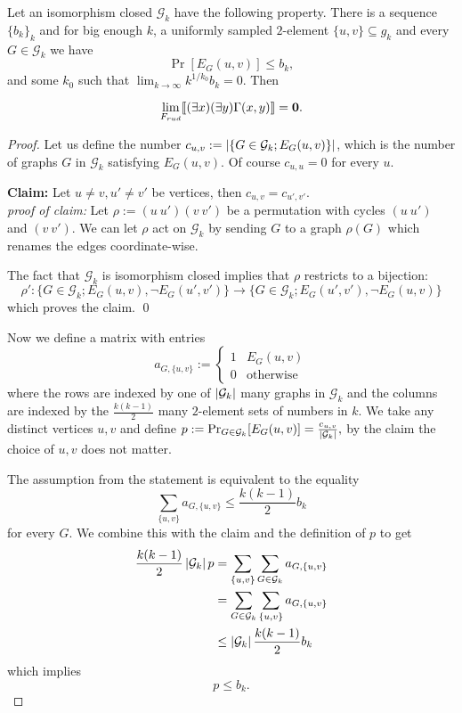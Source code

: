 \begin{thrm}\label{thrmsparse}
Let an isomorphism closed $\mathcal{G}_k$ have the following property. There is a sequence $\{b_k\}_{k}$ and for big enough $k$, a uniformly sampled $2$-element $\{u,v\}\subseteq g_k$ and every $G\in\mathcal{G}_k$ we have
\[\Pr[E_G(u,v)]\leq b_k,\]
and some $k_0$ such that $\lim_{k\to\infty}k^{1/k_0}b_k = 0.$ Then

\[\lim_{F_{rud}}\llbracket(\exists x)(\exists y)\Gamma(x,y)\rrbracket=\textbf{0}.\]
\end{thrm}
\begin{proof}
Let us define the number $c_{u,v}:=\left|{\{G\in\mathcal{G}_k; E_G(u,v)\}}\right|$, which is the number of graphs $G$ in $\mathcal{G}_k$ satisfying $E_G(u,v)$. Of course $c_{u,u}=0$ for every $u$.

\vspace{0.5em}
\textbf{Claim:} Let $u\neq v,u'\neq v'$ be vertices, then $c_{u,v}=c_{u',v'}$.\\
\textit{proof of claim:} Let $\rho:=(u\:u')(v\:v')$ be a permutation with cycles $(u\:u')$ and $(v\:v')$. We can let $\rho$ act on $\mathcal{G}_k$ by sending $G$ to a graph $\rho(G)$ which renames the edges coordinate-wise.

The fact that $\mathcal{G}_k$ is isomorphism closed implies that $\rho$ restricts to a bijection:
\[\rho':\{G\in\mathcal{G}_k;E_G(u,v), \lnot E_G(u',v')\}\to \{G\in\mathcal{G}_k;E_G(u',v'),\lnot E_G(u,v)\}\]
which proves the claim. \qed
\vspace{0.5em}

Now we define a matrix with entries
\[a_{G,\{u,v\}}:=\begin{cases}1&E_G(u,v)\\0&\text{otherwise}\end{cases}\]
where the rows are indexed by one of $\left|{\mathcal{G}_k}\right|$ many graphs in $\mathcal{G}_k$ and the columns are indexed by the $\frac{k(k-1)}{2}$ many $2$-element sets of numbers in $k$. We take any distinct vertices $u,v$ and define $p:=\Pr_{G\in \mathcal{G}_k}[E_G(u,v)]=\frac{c_{u,v}}{\left|{\mathcal{G}_k}\right|},$ by the claim the choice of $u,v$ does not matter.

The assumption from the statement is equivalent to the equality 
\[\sum_{\{u,v\}}a_{G,\{u,v\}}\leq \frac{k(k-1)}{2}b_k\] 
for every $G$. We combine this with the claim and the definition of $p$ to get
\begin{align}
\frac{k(k-1)}{2}\left|{\mathcal{G}_k}\right|p&=\sum_{\{u,v\}}\sum_{G\in\mathcal{G}_k}a_{G,\{u,v\}}\\
&=\sum_{G\in\mathcal{G}_k}\sum_{\{u,v\}}a_{G,\{u,v\}}\\
&\leq \left|{\mathcal{G}_k}\right|\frac{k(k-1)}{2}b_k
\end{align}
which implies
\[p\leq b_k.\]


\end{proof}
